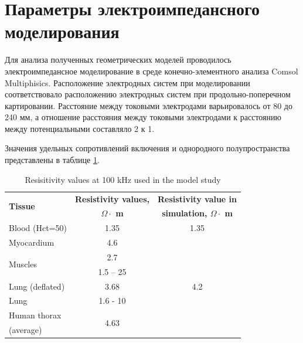 \documentclass[conference]{IEEEtran}
\begin{document}
\section{Параметры электроимпедансного моделирования}
Для анализа полученных геометрических моделей проводилось электроимпедансное моделирование в среде конечно-элементного анализа Comsol Multiphisics.
Расположение электродных систем при моделировании соответствовало расположению электродных систем при продольно-поперечном картировании. Расстояние между токовыми электродами варьировалось от 80 до 240 мм, а отношение расстояния между токовыми электродами к расстоянию между потенциальными составляло 2 к 1.

Значения удельных сопротивлений включения и однородного полупространства представлены в таблице \ref{tab:table}.

\begin{table}[htbp]
    \caption{Resisitivity values at  100 kHz used in the model study}
    \begin{center}
        \begin{tabular}{|l|c|c|}
            \hline
            \multirow{2}{*}{\textbf{Tissue}}              &     \textbf{Resistivity values,}      &    \textbf{Resistivity value in}  \\
            &   \textbf{$\Omega \cdot$ m}     &   \textbf{ simulation, $\Omega \cdot$ m} \\
            \hline
            Blood (Hct=50)           & 1.35\cite{Hill1975}           & 1.35      \\
            \hline
            Myocardium               & 4.6 \cite{Hasgall}       & \multirow{7}{*}{4.2}\\
            \cline{1-2}
            \multirow{2}{*}{Muscles} & 2.7 \cite{Hasgall}           &     \\
            \cline{2-2}
            & 1.5 – 25 \cite{Rush1963}           &   \\
            \cline{1-2}
            Lung (deflated)          & 3.68 \cite{Hasgall}     &         \\
            \cline{1-2}
            Lung                     & 1.6 - 10 \cite{Grimnes2008}       &    \\
            \cline{1-2}
            Human thorax & \multirow{2}{*}{4.63 \cite{Rush1963} }  &   \\
            (average)   & &   \\
            \hline
        \end{tabular}
        \label{tab:table}
    \end{center}
\end{table}
\end{document}
